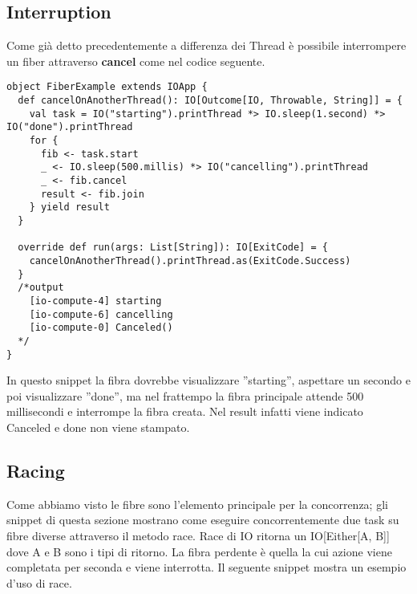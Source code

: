 \subsection{Interruption}
Come già detto precedentemente a differenza dei Thread è possibile interrompere un fiber attraverso \textbf{cancel} come nel codice seguente.

\begin{verbatim}
object FiberExample extends IOApp {
  def cancelOnAnotherThread(): IO[Outcome[IO, Throwable, String]] = {
    val task = IO("starting").printThread *> IO.sleep(1.second) *> IO("done").printThread
    for {
      fib <- task.start
      _ <- IO.sleep(500.millis) *> IO("cancelling").printThread
      _ <- fib.cancel
      result <- fib.join
    } yield result
  }
  
  override def run(args: List[String]): IO[ExitCode] = {
    cancelOnAnotherThread().printThread.as(ExitCode.Success) 
  }
  /*output
    [io-compute-4] starting
    [io-compute-6] cancelling
    [io-compute-0] Canceled()
  */
}
\end{verbatim}

\noindent In questo snippet la fibra dovrebbe visualizzare ”starting”, aspettare un secondo e poi visualizzare ”done”, ma nel frattempo la fibra  principale attende 500 millisecondi e interrompe la fibra creata. Nel result infatti viene indicato Canceled e done non viene stampato. 

\subsection{Racing}
Come abbiamo visto le fibre sono l'elemento principale per la concorrenza; gli snippet di questa sezione mostrano come eseguire concorrentemente due task su fibre diverse attraverso il metodo race. Race di IO ritorna un IO[Either[A, B]] dove A e B
sono i tipi di ritorno. La fibra perdente è quella la cui azione viene completata per seconda e viene interrotta. Il seguente snippet mostra un esempio d'uso di race.

